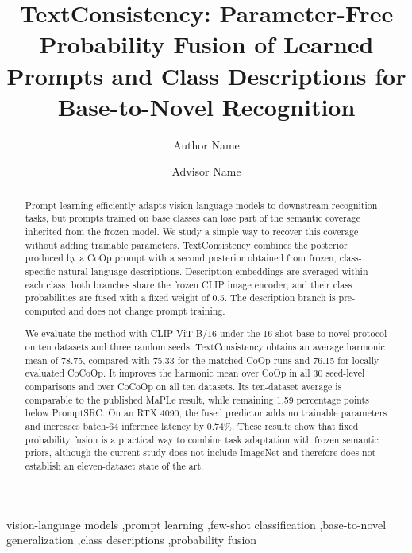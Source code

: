 \documentclass[preprint,12pt]{elsarticle}
\begin{document}
\begin{frontmatter}

\title{TextConsistency: Parameter-Free Probability Fusion of Learned Prompts and Class Descriptions for Base-to-Novel Recognition}

\author[1]{Author Name}

\author[1]{Advisor Name}


\begin{abstract}
Prompt learning efficiently adapts vision-language models to downstream recognition tasks, but prompts trained on base classes can lose part of the semantic coverage inherited from the frozen model. We study a simple way to recover this coverage without adding trainable parameters. TextConsistency combines the posterior produced by a CoOp prompt with a second posterior obtained from frozen, class-specific natural-language descriptions. Description embeddings are averaged within each class, both branches share the frozen CLIP image encoder, and their class probabilities are fused with a fixed weight of 0.5. The description branch is pre-computed and does not change prompt training.

We evaluate the method with CLIP ViT-B/16 under the 16-shot base-to-novel protocol on ten datasets and three random seeds. TextConsistency obtains an average harmonic mean of 78.75, compared with 75.33 for the matched CoOp runs and 76.15 for locally evaluated CoCoOp. It improves the harmonic mean over CoOp in all 30 seed-level comparisons and over CoCoOp on all ten datasets. Its ten-dataset average is comparable to the published MaPLe result, while remaining 1.59 percentage points below PromptSRC. On an RTX 4090, the fused predictor adds no trainable parameters and increases batch-64 inference latency by 0.74\%. These results show that fixed probability fusion is a practical way to combine task adaptation with frozen semantic priors, although the current study does not include ImageNet and therefore does not establish an eleven-dataset state of the art.
\end{abstract}

\begin{keyword}
vision-language models \sep prompt learning \sep few-shot classification \sep base-to-novel generalization \sep class descriptions \sep probability fusion
\end{keyword}

\end{frontmatter}
\end{document}
